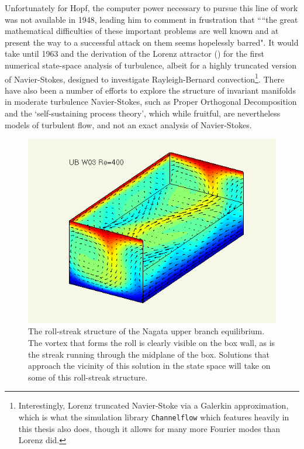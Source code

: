 {Unfortunately for Hopf, the computer power necessary to pursue this line of work was not available in 1948, leading him to comment in frustration that ``“the great mathematical difficulties of these important problems are well
known and at present the way to a successful attack on them seems hopelessly
barred". It would take until 1963 and the derivation of the Lorenz attractor () for the first numerical state-space analysis of turbulence, albeit for a highly truncated version of Navier-Stokes, designed to investigate Rayleigh-Bernard convection\footnote{Interestingly, Lorenz truncated Navier-Stoke via a Galerkin approximation, which is what the simulation library {\tt Channelflow} which features heavily in this thesis also does, though it allows for many more Fourier modes than Lorenz did.}. There have also been a number of efforts to explore the structure of invariant manifolds in moderate turbulence Navier-Stokes, such as Proper Orthogonal Decomposition and the `self-sustaining process theory', which while fruitful, are nevertheless models of turbulent flow, and not an exact analysis of Navier-Stokes.\\
\begin{figure}[h]
\centerline{\includegraphics[scale=0.5]{Figs/rollStreak}}
\caption{The roll-streak structure of the Nagata upper branch equilibrium. The vortex that forms the roll is clearly visible on the box wall, as is the streak running through the midplane of the box. Solutions that approach the vicinity of this solution in the state space will take on some of this roll-streak structure.}\label{fig:rollstreak}

\end{figure}}
